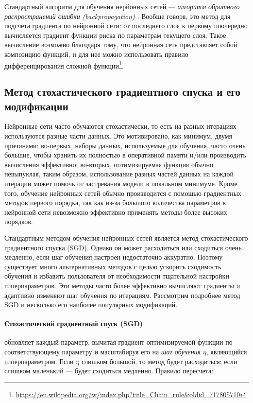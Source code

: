 \documentclass[12pt]{article}
\begin{document}
Стандартный алгоритм для обучения нерйонных сетей --- \textit{алгоритм обратного распространений ошибки (backpropagation)} \cite{backprop}. Вообще говоря, это метод для подсчета градиента по нейронной сети: от последнего слоя к первому поочередно вычисляется градиент функции риска по параметрам текущего слоя. Такое вычисление возможно благодаря тому, что нейронная сеть представляет собой композицию функций, и для нее можно использовать правило дифференцирования сложной функции\footnote{\url{https://en.wikipedia.org/w/index.php?title=Chain_rule&oldid=717805710}}.


\subsection{Метод стохастического градиентного спуска и его модификации}

Нейронные сети часто обучаются стохастически, то есть на разных итерациях используются разные части данных. Это мотивировано, как минимум, двумя причинами: во-первых, наборы данных, используемые для обучения, часто очень большие, чтобы хранить их полностью в оперативной памяти и/или производить вычисления эффективно; во-вторых, оптимизируемая функция обычно невыпуклая, таким образом, использование разных частей данных на каждой итерации может помочь от застревания модели в локальном минимуме. Кроме того, обучение нейронных сетей обычно производится с помощью градиентных методов первого порядка, так как из-за большого количества параметров в нейронной сети невозможно эффективно применять методы более высоких порядков.

Стандартным методом обучения нейронных сетей является метод стохастического градиентного спуска (SGD). Однако он может расходиться или сходиться очень медленно, если шаг обучения настроен недостаточно аккуратно. Поэтому существует много альтернативных методов с целью ускорить сходимость обучения и избавить пользователя от необходимости тщательной настройки гиперпараметров. Эти методы часто более эффективно вычисляют градиенты и адаптивно изменяют шаг обучения по итерациям. Рассмотрим подробнее метод SGD и несколько его наиболее популярных модификаций.


\paragraph{Стохастический градиентный спуск (SGD) \cite{sgd}} обновляет каждый параметр, вычитая градиент оптимизируемой функции по соответствующему параметру и масштабируя его на \textit{шаг обучения} $\eta$, являющийся гиперпараметром. Если $\eta$ слишком большой, то метод будет расходиться; если слишком маленький --- будет сходиться медленно. Правило пересчета:
\end{document}
